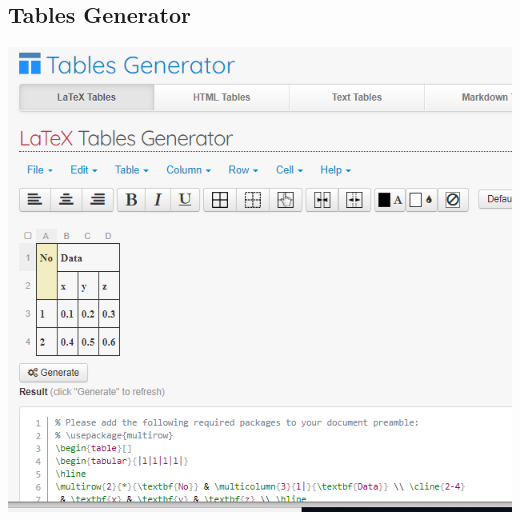 \subsection{Tables Generator }
\begin{center}
	
	\includegraphics[width=0.7\linewidth]{bab2/TabelGenerator}
	\label{fig:tabelgenerator}
\end{center}

